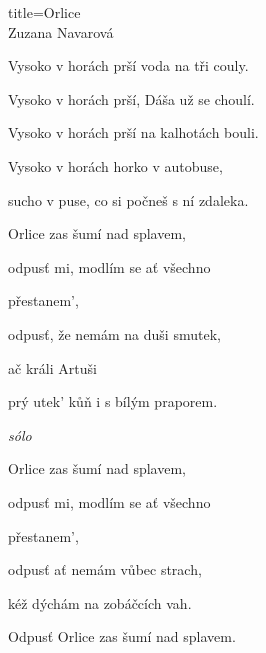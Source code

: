 \begin{song}{title=\predtitle\centering Orlice \\\large Zuzana Navarová  \vspace*{-0.3cm}}
{\begin{centerjustified}
\begin{varwidth}[t]{0.5\textwidth}
	Vysoko v horách prší voda na tři couly.

	Vysoko v horách prší, Dáša už se choulí.

	Vysoko v horách prší na kalhotách bouli.

	Vysoko v horách horko v autobuse,

	sucho v puse, co si počneš s ní zdaleka.

\sloka
	Orlice zas šumí nad splavem,

	odpusť mi, modlím se ať všechno

	přestanem',

	odpusť, že nemám na duši smutek,

	ač králi Artuši

	prý utek' kůň i s bílým praporem.

\textit{sólo}

\sloka
	Orlice zas šumí nad splavem,

	odpusť mi, modlím se ať všechno

	přestanem',

	odpusť ať nemám vůbec strach,

	kéž dýchám na zobáčcích vah.

	Odpusť Orlice zas šumí nad splavem.
\end{varwidth}
\end{centerjustified}
}

\setcounter{Slokočet}{0}
\end{song}
